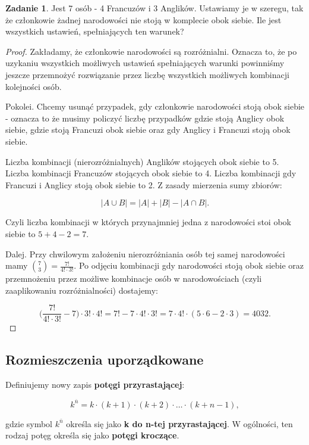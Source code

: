 \documentclass[11pt]{article}
\theoremstyle{definition}
\newtheorem{zadanie}{Zadanie}
\numberwithin{zadanie}{subsection}
\begin{document}
\begin{zadanie}
    Jest 7 osób - 4 Francuzów i 3 Anglików. Ustawiamy je w szeregu, tak że członkowie żadnej narodowości nie stoją w komplecie obok siebie. Ile jest wszystkich ustawień, spełniających ten warunek?
\end{zadanie}
\begin{proof}
    Zakładamy, że członkowie narodowości są rozróżnialni. Oznacza to, że po uzykaniu wszystkich możliwych ustawień spełniających warunki powinniśmy jeszcze przemnożyć rozwiązanie przez liczbę wszystkich możliwych kombinacji kolejności osób.

    Pokolei. Chcemy usunąć przypadek, gdy członkowie narodowości stoją obok siebie - oznacza to że musimy policzyć liczbę przypadków gdzie stoją Anglicy obok siebie, gdzie stoją Francuzi obok siebie oraz gdy Anglicy i Francuzi stoją obok siebie.

    Liczba kombinacji (nierozróżnialnych) Anglików stojących obok siebie to 5. Liczba kombinacji Francuzów stojących obok siebie to 4. Liczba kombinacji gdy Francuzi i Anglicy stoją obok siebie to 2. Z zasady mierzenia sumy zbiorów:

    $$|A\cup B| = |A| + |B| - |A\cap B|.$$

    Czyli liczba kombinacji w których przynajmniej jedna z narodowości stoi obok siebie to $5+4-2 = 7$.

    Dalej. Przy chwilowym założeniu nierozróżniania osób tej samej narodowości mamy $\binom73 = \frac{7!}{4!\cdot 3!}.$ Po odjęciu kombinacji gdy narodowości stoją obok siebie oraz przemnożeniu przez możliwe kombinacje osób w narodowościach (czyli zaaplikowaniu rozróżnialności) dostajemy:

    $$\Big(\frac{7!}{4!\cdot3!} - 7\Big)\cdot3!\cdot4! = 7!-7\cdot4!\cdot3! = 7\cdot 4!\cdot(5\cdot 6 - 2\cdot 3) = 4032.$$
\end{proof}

\subsection{Rozmieszczenia uporządkowane}

Definiujemy nowy zapis \textbf{potęgi przyrastającej}:

$$k^{\overline{n}} = k\cdot(k+1)\cdot(k+2)\cdot\dots\cdot(k+n-1),$$

gdzie symbol $k^{\bar n}$ określa się jako \textbf{k do n-tej przyrastającej}. W ogólności, ten rodzaj potęg określa się jako \textbf{potęgi kroczące}.
\end{document}
